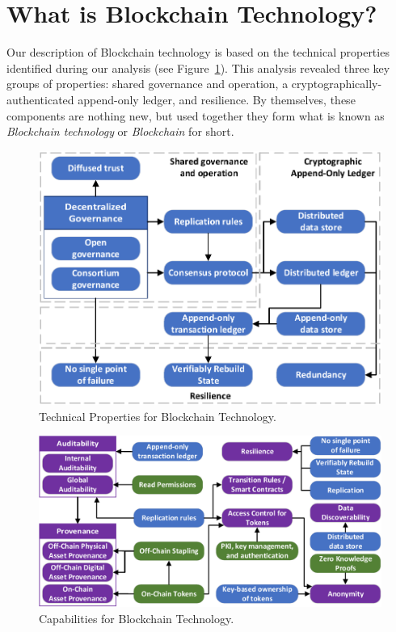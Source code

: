 
\section{What is Blockchain Technology?}
\label{sec:blockchain}
Our description of Blockchain technology is based on the technical properties identified during our analysis (see Figure~\ref{fig:technical-properties}).
This analysis revealed three key groups of properties: shared governance and operation, a cryptographically-authenticated append-only ledger, and resilience.
By themselves, these components are nothing new, but used together they form what is known as \emph{Blockchain technology} or \emph{Blockchain} for short.

\begin{figure}
	\centering
	\includegraphics[width=\columnwidth]{figures/technical-properties}	
	\caption{Technical Properties for Blockchain Technology.}
	\label{fig:technical-properties}
\end{figure}

\begin{figure}
	\centering
	\includegraphics[width=\columnwidth]{figures/capabilities}	
	\caption{Capabilities for Blockchain Technology.}
	\label{fig:capabilities}
\end{figure}

